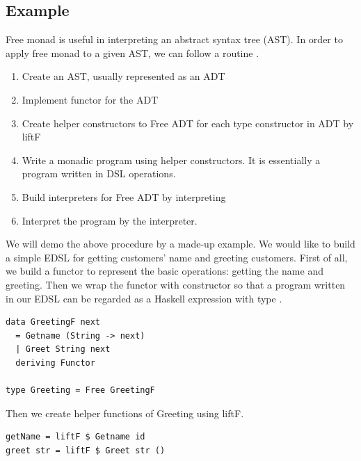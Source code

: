 \subsection{Example} \label{b:fm:e}
Free monad is useful in interpreting an abstract syntax tree (AST). In order to apply free monad to a given AST, we can follow a routine \cite{contributorsCatsFreeMonads}.
\begin{enumerate}
  \item Create an AST, usually represented as an ADT
  \item Implement functor for the ADT
  \item Create helper constructors to Free ADT for each type constructor in ADT by liftF 
  \item Write a monadic program using helper constructors. It is essentially a program written in DSL operations.
  \item Build interpreters for Free ADT by interpreting
  \item Interpret the program by the interpreter.
\end{enumerate}
We will demo the above procedure by a made-up example. We would like to build a simple EDSL for getting customers' name and greeting customers. First of all, we build a functor  to represent the basic operations: getting the name and greeting. Then we wrap the functor with  constructor so that a program written in our EDSL can be regarded as a Haskell expression with type .
\begin{code}
\begin{verbatim}
data GreetingF next
  = Getname (String -> next)
  | Greet String next
  deriving Functor

type Greeting = Free GreetingF
\end{verbatim}
\end{code}
Then we create helper functions of Greeting using liftF.
\begin{verbatim}
getName = liftF $ Getname id
greet str = liftF $ Greet str ()
\end{verbatim}
